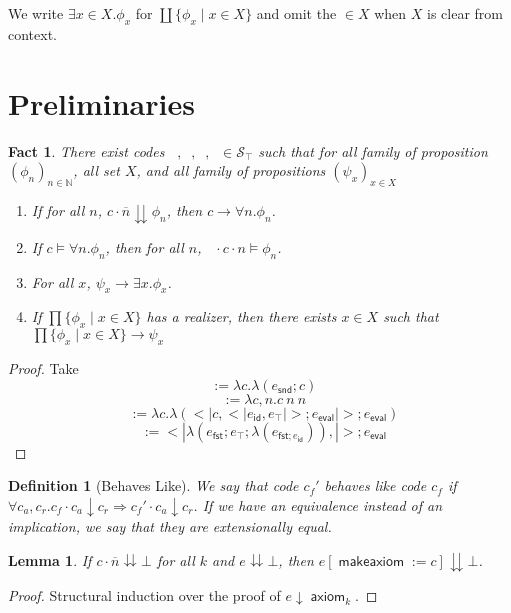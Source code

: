 \documentclass{article}
\newtheorem{definition}{Definition}
\newtheorem{lemma}{Lemma}
\newtheorem{fact}{Fact}
\DeclareMathOperator{\makeaxiom}{\mathsf{makeaxiom}}
\DeclareMathOperator{\axiom}{\mathsf{axiom}}
\DeclareMathOperator{\introexists}{\mathsf{intro}_\exists}
\DeclareMathOperator{\introforall}{\mathsf{intro}_\forall}
\DeclareMathOperator{\elimexists}{\mathsf{elim}_\exists}
\DeclareMathOperator{\elimforall}{\mathsf{elim}_\forall}
\newcommand{\N}{\mathbb{N}}
\newcommand{\septop}{\mathcal{S}_\top}
\begin{document}
We write $\exists x \in X. \phi_x$ for $\coprod \{\phi_x \mid x \in X\}$ and omit the $\in X$ when $X$ is clear from context.

\section{Preliminaries}

\begin{fact}
    There exist codes $\introexists, \introforall, \elimexists, \elimforall \in \septop$ such that for all family of proposition $(\phi_n)_{n \in \N}$, all set $X$, and all family of propositions $(\psi_x)_{x \in X}$
    \begin{enumerate}
        \item If for all $n$, $c \cdot \overline{n} \downdownarrows \phi_n$, then $c \xrightarrow{\introforall} \forall n. \phi_n$.
        \item If $c \models \forall n. \phi_n$, then for all $n$, $\elimforall \cdot c \cdot n \models \phi_n$.
        \item For all $x$, $\psi_x \xrightarrow{\introexists} \exists x. \phi_x$.
        \item If $\prod \{ \phi_x \mid x \in X \}$ has a realizer, then there exists $x \in X$ such that $\prod \{ \phi_x \mid x \in X \} \xrightarrow{\elimexists} \psi_x$
    \end{enumerate}
\end{fact}
\begin{proof}
    Take
    \[\introforall := \lambda c. \lambda (e_{\mathsf{snd}}; c)\]
    \[\elimforall := \lambda c, n. c\ n\ n\]
    \[\introexists := \lambda c. \lambda(<|c, <|e_{\mathsf{id}}, e_\top|>; e_{\mathsf{eval}}|>; e_{\mathsf{eval}})\]
    \[\elimexists := <|\lambda (e_{\mathsf{fst}}; e_\top; \lambda(e_{\mathsf{fst}; e_{\mathsf{id}}})), |>; e_{\mathsf{eval}}\]
\end{proof}

\begin{definition}[Behaves Like]
    We say that code $c_f'$ behaves like code $c_f$ if $\forall c_a, c_r. c_f \cdot c_a \downarrow c_r \Rightarrow c_f' \cdot c_a \downarrow c_r$.
    If we have an equivalence instead of an implication, we say that they are extensionally equal.
\end{definition}

\begin{lemma}\label{substaxiomcongr}
    If $c \cdot \overline{n} \downdownarrows \bot$ for all $k$ and $e \downdownarrows \bot$, then $e[\makeaxiom := c] \downdownarrows \bot$.
\end{lemma}
\begin{proof}
    Structural induction over the proof of $e \downarrow \axiom_k$.
\end{proof}
\end{document}
